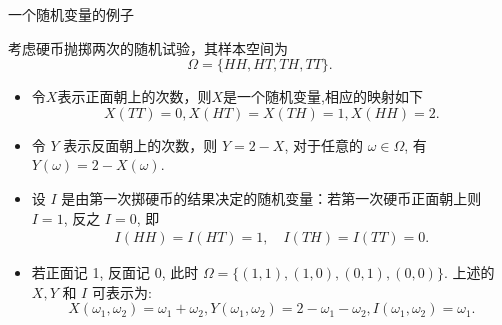 \begin{frame}{一个随机变量的例子}
	\begin{exam}\label{312}
		考虑硬币抛掷两次的随机试验，其样本空间为 $$\Omega=\{HH,HT,TH,TT\}.$$ %
		\begin{itemize}[<+-|alert@+>]
			\item 令$X$表示正面朝上的次数，则$X$是一个随机变量,相应的映射如下
			      $$X(TT)=0, X(HT)=X(TH)=1, X(HH)=2.$$
			\item 令 $Y$ 表示反面朝上的次数，则 $Y=2-X$, 对于任意的 $\omega\in \Omega$, 有 $Y (\omega)=2-X (\omega)$.
			\item 设 $I$ 是由第一次掷硬币的结果决定的随机变量：若第一次硬币正面朝上则 $I=1$, 反之 $I=0$, 即
			      \begin{align*}
				      I(HH)=I(HT)=1,\quad I(TH)=I(TT)=0.
			      \end{align*}
			\item 若正面记 1, 反面记 0, 此时 $\Omega=\{(1,1),(1,0),(0,1),(0,0)\}$. 上述的 $X,Y$ 和 $I$ 可表示为:$$X (\omega_1,\omega_2)=\omega_1+\omega_2,Y (\omega_1,\omega_2)=2-\omega_1-\omega_2,I (\omega_1,\omega_2)=\omega_1.$$
		\end{itemize}
	\end{exam}
\end{frame}



